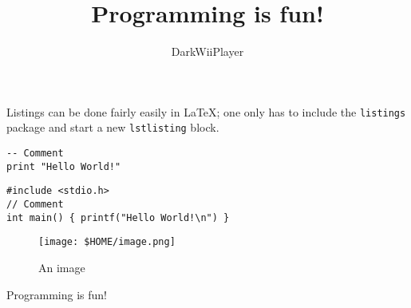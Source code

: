 \documentclass{scrartcl}
\title{Programming is fun!}
\author{DarkWiiPlayer}
\def\code#1{\texttt{#1}}
\begin{document}

\maketitle

Listings can be done fairly easily in LaTeX; one only has to include the \code{listings} package and start a new \code{lstlisting} block.

\begin{lstlisting}
-- Comment
print "Hello World!"
\end{lstlisting}

\begin{lstlisting}
#include <stdio.h>
// Comment
int main() { printf("Hello World!\n") }
\end{lstlisting}

\begin{figure}[h]
	\centering
	\texttt{[image: \$HOME/image.png]}
	\caption{An image}
	\label{fig:image1}
\end{figure}

Programming is fun! \cite{sicp}

\printbibliography
\end{document}
